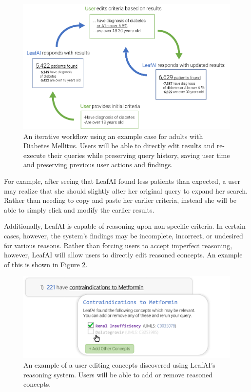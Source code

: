 \documentclass[../main.tex]{subfiles}
\begin{document}
\begin{figure}[h!]
  \centering
  \includegraphics[scale=1]{Figures/8_web_application/leafai_feedback_loop.pdf}  
  \caption{An iterative workflow using an example case for adults with Diabetes Mellitus. Users will be able to directly edit results and re-execute their queries while preserving query history, saving user time and preserving previous user actions and findings.}
\label{fig_leafai_feedback_loop}
\end{figure}

For example, after seeing that LeafAI found less patients than expected, a user may realize that she should slightly alter her original query to expand her search. Rather than needing to copy and paste her earlier criteria, instead she will be able to simply click and modify the earlier results.

Additionally, LeafAI is capable of reasoning upon non-specific criteria. In certain cases, however, the system's findings may be incomplete, incorrect, or undesired for various reasons. Rather than forcing users to accept imperfect reasoning, however, LeafAI will allow users to directly edit reasoned concepts. An example of this is shown in Figure \ref{fig_leafai_edit}.

\begin{figure}[h!]
  \centering
  \includegraphics[scale=0.68]{Figures/8_web_application/leafai_edit.pdf}  
  \caption{An example of a user editing concepts discovered using LeafAI's reasoning system. Users will be able to add or remove reasoned concepts.}
\label{fig_leafai_edit}
\end{figure}
\end{document}
